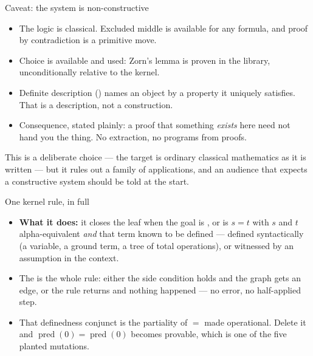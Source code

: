 \documentclass[11pt,aspectratio=169]{beamer}
\begin{document}
\begin{frame}{Caveat: the system is non-constructive}
  \begin{itemize}
    \item The logic is classical. Excluded middle is available for any
          formula, and proof by contradiction is a primitive move.
    \item Choice is available and used: Zorn's lemma is proven in the library,
          unconditionally relative to the kernel.
    \item Definite description () names an object by a property it
          uniquely satisfies. That is a description, not a construction.
    \item Consequence, stated plainly: a proof that something \emph{exists}
          here need not hand you the thing. No extraction, no programs from
          proofs.
  \end{itemize}
  \vfill
  \small This is a deliberate choice --- the target is ordinary classical
  mathematics as it is written --- but it rules out a family of applications,
  and an audience that expects a constructive system should be told at the
  start.
\end{frame}

\begin{frame}[fragile]{One kernel rule, in full}
  \vspace{-0.5ex}
  \begin{itemize}\footnotesize
    \item \textbf{What it does:} it closes the leaf  when the goal is
          , or is $s = t$ with $s$ and $t$ alpha-equivalent
          \emph{and} that term known to be defined --- defined syntactically
          (a variable, a ground term, a tree of total operations), or witnessed
          by an assumption in the context.
    \item The  is the whole rule: either the side condition holds and
          the graph gets an edge, or the rule returns  and nothing
          happened --- no error, no half-applied step.
    \item That definedness conjunct is the partiality of $=$ made operational.
          Delete it and $\operatorname{pred}(0) = \operatorname{pred}(0)$
          becomes provable, which is one of the five planted mutations.
  \end{itemize}
\end{frame}
\end{document}

